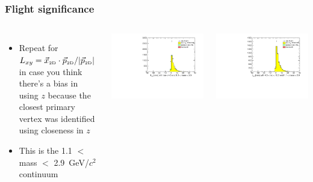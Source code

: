 \documentclass[compress]{beamer}
\newcommand{\s}[1]{{\mbox{\scriptsize #1}}}
\begin{document}
\begin{frame}
\frametitle{Flight significance}

\begin{columns}
\begin{itemize}
\item Repeat for $L_{xy} = \vec{x}_\s{\tiny 2D} \cdot \vec{p}_\s{\tiny 2D} /
  |\vec{p}_\s{\tiny 2D}|$ in case you think there's a bias in using $z$
  because the closest primary vertex was identified using closeness in $z$

\item This is the 1.1 $<$ mass $<$ 2.9~GeV/$c^2$ continuum
\end{itemize}

\includegraphics[width=\linewidth]{lowdimuon_lxy_midmass_isolated.pdf}

\includegraphics[width=\linewidth]{lowdimuon_lxy_midmass_isosideband.pdf}


\end{columns}
\end{frame}
\end{document}
